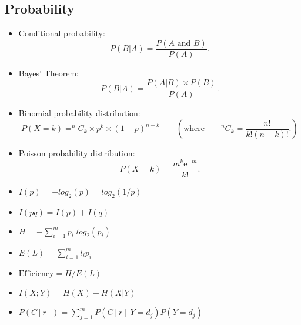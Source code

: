 \subsection*{Probability}
\begin{itemize}

\item Conditional probability:
\begin{equation*}
P(B|A)=\frac{P\left( A\text{ and }B\right) }{P\left( A\right) }.
\end{equation*}


\item Bayes' Theorem:
\begin{equation*}
P(B|A)=\frac{P\left(A|B\right) \times P(B) }{P\left( A\right) }.
\end{equation*}


\item Binomial probability distribution:
\begin{equation*}
P(X = k) = ^{n}C_{k} \times p^{k} \times \left( 1-p\right) ^{n-k}\qquad \left( \text{where}\qquad
^{n}C_{k} =\frac{n!}{k!\left(n-k\right) !}. \right)
\end{equation*}

\item Poisson probability distribution:
\begin{equation*}
P(X = k) =\frac{m^{k}\mathrm{e}^{-m}}{k!}.
\end{equation*}
\end{itemize}


\begin{itemize}
\item $I(p) = - log_{2}(p) = log_{2}(1/p)$\\

\item $I(pq) = I(p) + I(q)$\\

\item $H = - \sum_{i=1}^{m}p_{i}\; log_{2}(p_{i})$\\

\item $E(L) = \sum_{i=1}^{m} l_{i} p_{i}$\\

\item $\mbox{Efficiency} = H / E(L)$\\

\item $I(X;Y) = H(X) - H(X|Y)$\\

\item $P(C[r]) = \sum_{j=1}^{m}P(C[r]|Y=d_{j} )P(Y=d_{j} )$

\end{itemize}


